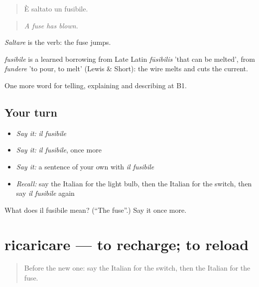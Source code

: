 \begin{quote}
È saltato un fusibile.
\end{quote}

\begin{quote}
\emph{A fuse has blown.}
\end{quote}

\emph{Saltare} is the verb: the fuse jumps.

\begin{cousinweb}
\emph{fusibile} is a learned borrowing from Late Latin \emph{fūsibilis} 'that can be melted', from \emph{fundere} 'to pour, to melt' (Lewis \& Short): the wire melts and cuts the current.
\end{cousinweb}

\begin{grammarlens}[title={What you've built}]
One more word for telling, explaining and describing at B1.
\end{grammarlens}

\subsection*{Your turn}
\begin{itemize}
\raggedright
  \item \emph{Say it:} \emph{il fusibile}
  \item \emph{Say it:} \emph{il fusibile}, once more
  \item \emph{Say it:} a sentence of your own with \emph{il fusibile}
  \item \emph{Recall:} say the Italian for the light bulb, then the Italian for the switch, then say \emph{il fusibile} again
\end{itemize}

\begin{tcolorbox}[breakable,colback=teal!4,colframe=teal!35!black,title={Before you move on}]
What does il fusibile mean? (\textquotedblleft{}The fuse\textquotedblright{}.) Say it once more.
\end{tcolorbox}
\section[ricaricare]{ricaricare — to recharge; to reload}

\label{lesson:IT-C436-ricaricare}



\begin{quote}
Before the new one: say the Italian for the switch, then the Italian for the fuse.
\end{quote}

